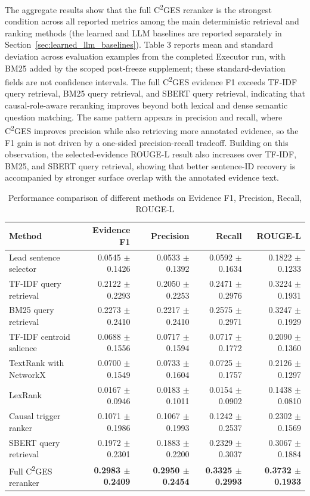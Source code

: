 \documentclass{ieeeaccess}
\begin{document}
\label{sec:main_quantitative_results}

The aggregate results show that the full C\textsuperscript{2}GES reranker is the strongest condition across all reported metrics among the main deterministic retrieval and ranking methods (the learned and LLM baselines are reported separately in Section~\ref{sec:learned_llm_baselines}). Table 3 reports mean and standard deviation across evaluation examples from the completed Executor run, with BM25 added by the scoped post-freeze supplement; these standard-deviation fields are not confidence intervals. The full C\textsuperscript{2}GES evidence F1 exceeds TF-IDF query retrieval, BM25 query retrieval, and SBERT query retrieval, indicating that causal-role-aware reranking improves beyond both lexical and dense semantic question matching. The same pattern appears in precision and recall, where C\textsuperscript{2}GES improves precision while also retrieving more annotated evidence, so the F1 gain is not driven by a one-sided precision-recall tradeoff. Building on this observation, the selected-evidence ROUGE-L result also increases over TF-IDF, BM25, and SBERT query retrieval, showing that better sentence-ID recovery is accompanied by stronger surface overlap with the annotated evidence text.

\begin{table}[ht]
\centering
\caption{Performance comparison of different methods on Evidence F1, Precision, Recall, ROUGE-L}
\label{tab:3}
\begin{tabular}{lrrrr}
\toprule
\textbf{Method} & \textbf{Evidence F1} & \textbf{Precision} & \textbf{Recall} & \textbf{ROUGE-L} \\
\midrule
Lead sentence selector & 0.0545 $\pm$ 0.1426 & 0.0533 $\pm$ 0.1392 & 0.0592 $\pm$ 0.1634 & 0.1822 $\pm$ 0.1233 \\
TF-IDF query retrieval & 0.2122 $\pm$ 0.2293 & 0.2050 $\pm$ 0.2253 & 0.2471 $\pm$ 0.2976 & 0.3224 $\pm$ 0.1931 \\
BM25 query retrieval & 0.2273 $\pm$ 0.2410 & 0.2217 $\pm$ 0.2410 & 0.2575 $\pm$ 0.2971 & 0.3247 $\pm$ 0.1929 \\
TF-IDF centroid salience & 0.0688 $\pm$ 0.1556 & 0.0717 $\pm$ 0.1594 & 0.0717 $\pm$ 0.1772 & 0.2090 $\pm$ 0.1360 \\
TextRank with NetworkX & 0.0700 $\pm$ 0.1549 & 0.0733 $\pm$ 0.1604 & 0.0725 $\pm$ 0.1757 & 0.2126 $\pm$ 0.1297 \\
LexRank & 0.0167 $\pm$ 0.0946 & 0.0183 $\pm$ 0.1011 & 0.0154 $\pm$ 0.0902 & 0.1438 $\pm$ 0.0810 \\
Causal trigger ranker & 0.1071 $\pm$ 0.1986 & 0.1067 $\pm$ 0.1993 & 0.1242 $\pm$ 0.2537 & 0.2302 $\pm$ 0.1569 \\
SBERT query retrieval & 0.1972 $\pm$ 0.2301 & 0.1883 $\pm$ 0.2200 & 0.2329 $\pm$ 0.3037 & 0.3067 $\pm$ 0.1884 \\
Full C\textsuperscript{2}GES reranker & \textbf{0.2983 $\pm$ 0.2409} & \textbf{0.2950 $\pm$ 0.2454} & \textbf{0.3325 $\pm$ 0.2993} & \textbf{0.3732 $\pm$ 0.1933} \\
\bottomrule
\end{tabular}
\end{table}
\end{document}
